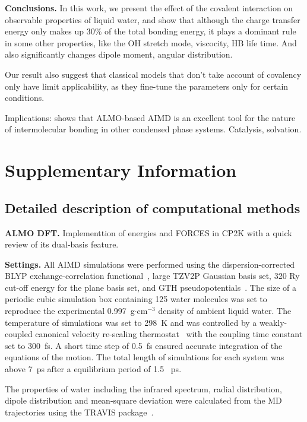 \documentclass[prl,twocolumn,showpacs]{revtex4}
\begin{document}
\textbf{Conclusions.} In this work, we present the effect of the covalent interaction on observable properties of liquid water, and show that although the charge transfer energy only makes up 30\% of the total bonding energy, it plays a dominant rule in some other properties, like the OH stretch mode, viscocity, HB life time. And also significantly changes dipole moment, angular distribution. 
 
Our result also suggest that classical models that don't take account of covalency only have limit applicability, as they fine-tune the parameters only for certain conditions.
 
Implications: shows that ALMO-based AIMD is an excellent tool for the nature of intermolecular bonding in other condensed phase systems. Catalysis, solvation.

\section{Supplementary Information}

\subsection{Detailed description of computational methods}

\textbf{ALMO DFT.} Implementtion of energies and FORCES in CP2K with a quick review of its dual-basis feature.

\textbf{Settings.} All AIMD simulations were performed using the dispersion-corrected~\cite{grimme2010consistent} BLYP exchange-correlation functional~\cite{becke1988density}, large TZV2P Gaussian basis set, 320 Ry cut-off energy for the plane basis set, and GTH pseudopotentials~\cite{goedecker1996separable,krack2005pseudopotentials}. The size of a periodic cubic simulation box containing 125 water molecules was set to reproduce the experimental 0.997~g$\cdot$cm$^{-3}$ density of ambient liquid water. The temperature of simulations was set to 298~K and was controlled by a weakly-coupled canonical velocity re-scaling thermostat~\cite{bussi2007canonical} with the coupling time constant set to 300~fs. A short time step of 0.5~fs ensured accurate integration of the equations of the motion. The total length of simulations for each system was above 7~ps after a equilibrium period of 1.5 ~ps.

The properties of water including the infrared spectrum, radial distribution, dipole distribution and mean-square deviation were calculated from the MD trajectories using the TRAVIS package~\cite{brehm2012travis}.  
\end{document}
